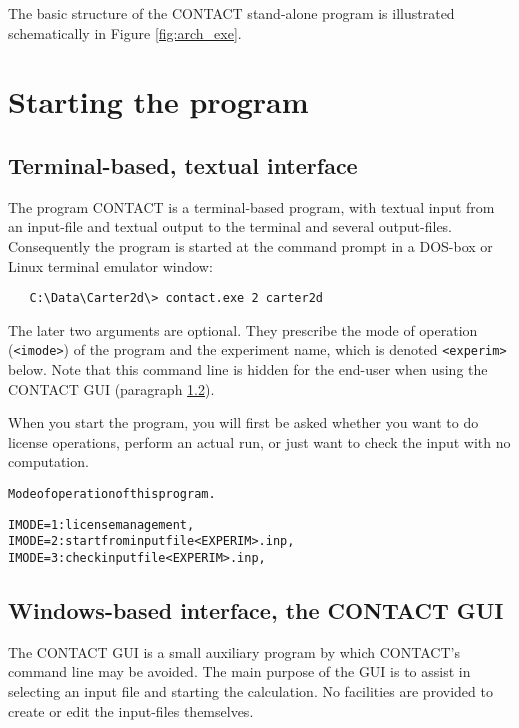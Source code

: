 \documentclass[12pt]{report}
\begin{document}
The basic structure of the CONTACT stand-alone program is illustrated
schematically in Figure \ref{fig:arch_exe}.

\section{Starting the program}

\subsection{Terminal-based, textual interface}
\label{sec:term_based}

The program CONTACT is a terminal-based program, with textual input from
an input-file and textual output to the terminal and several output-files.
Consequently the program is started at the command prompt in a DOS-box or
Linux terminal emulator window:
{\small\begin{verbatim}
   C:\Data\Carter2d\> contact.exe 2 carter2d
\end{verbatim}}
The later two arguments are optional. They prescribe the mode of operation
({\tt <imode>}) of the program and the experiment name, which is denoted
\verb+<experim>+ below. Note that this command line is hidden for the
end-user when using the CONTACT GUI (paragraph \ref{sec:contact_gui}).

When you start the program, you will first be asked whether you want to do
license operations, perform an actual run, or just want to check the input
with no computation.
\begin{alltt}\small
   Mode of operation of this program.

   IMODE=1: license management,
   IMODE=2: start from input file <EXPERIM>.inp,
   IMODE=3: check input file <EXPERIM>.inp,
\end{alltt}

\subsection{Windows-based interface, the CONTACT GUI}
\label{sec:contact_gui}

The CONTACT GUI is a small auxiliary program by which CONTACT's command
line may be avoided. The main purpose of the GUI is to assist in selecting
an input file and starting the calculation. No facilities are provided to
create or edit the input-files themselves.
\end{document}

